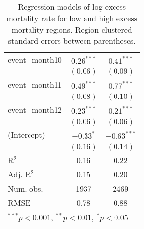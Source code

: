 \begin{table}
\begin{center}
\begin{tabular}{l c c }
event\_month10     & $0.26^{***}$ & $0.41^{***}$  \\
                   & $(0.06)$     & $(0.09)$      \\
event\_month11     & $0.49^{***}$ & $0.77^{***}$  \\
                   & $(0.08)$     & $(0.10)$      \\
event\_month12     & $0.23^{***}$ & $0.21^{***}$  \\
                   & $(0.06)$     & $(0.06)$      \\
(Intercept)        & $-0.33^{*}$  & $-0.63^{***}$ \\
                   & $(0.16)$     & $(0.14)$      \\
\hline
R$^2$              & 0.16         & 0.22          \\
Adj. R$^2$         & 0.15         & 0.20          \\
Num. obs.          & 1937         & 2469          \\
RMSE               & 0.78         & 0.88          \\
\hline
\multicolumn{3}{l}{\scriptsize{$^{***}p<0.001$, $^{**}p<0.01$, $^*p<0.05$}}
\end{tabular}
\caption{Regression models of log excess mortality rate for low and high excess mortality regions. Region-clustered standard errors between parentheses.}
\label{tab:hilomodels}
\end{center}
\end{table}
